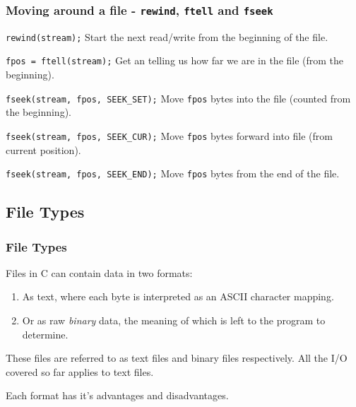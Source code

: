 \documentclass[smaller,table]{beamer}
\begin{document}
\begin{frame}
\frametitle{Moving around a file - {\tt rewind}, {\tt ftell} and {\tt fseek}}
\begin{block}{\tt rewind(stream);}
Start the next read/write from the beginning of the file.
\end{block}

\begin{block}{\tt fpos = ftell(stream);}
Get an  telling us how far we are in the file (from the beginning).
\end{block}

\begin{block}{\tt fseek(stream, fpos, SEEK\_SET);}
Move {\tt fpos} bytes into the file (counted from the beginning).
\end{block}

\begin{block}{\tt fseek(stream, fpos, SEEK\_CUR);}
Move {\tt fpos} bytes forward into file (from current position).
\end{block}

\begin{block}{\tt fseek(stream, fpos, SEEK\_END);}
Move {\tt fpos} bytes from the end of the file.
\end{block}
\end{frame}

\subsection{File Types}
\begin{frame}
\frametitle{File Types}
Files in C can contain data in two formats:
\begin{enumerate}
\item As text, where each byte is interpreted as an ASCII character mapping.
\item Or as raw \emph{binary} data, the meaning of which is left to the program to determine.
\end{enumerate}

These files are referred to as text files and binary files respectively. All the I/O covered so far applies to text files.

\begin{block}{}
\begin{center}
Each format has it's advantages and disadvantages.
\end{center}
\end{block}
\end{frame}
\end{document}
